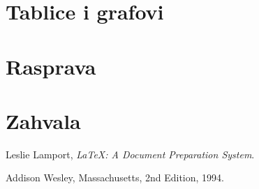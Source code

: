 \documentclass{scrreprt}
\begin{document}
\chapter{Tablice i grafovi}

\chapter{Rasprava}

\chapter{Zahvala}

\begin{thebibliography}{9}


    Leslie Lamport, \emph{\LaTeX: A Document Preparation System}.

    Addison Wesley, Massachusetts, 2nd Edition, 1994.

\end{thebibliography}
\end{document}
